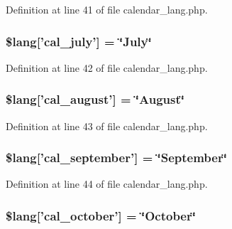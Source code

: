 Definition at line 41 of file calendar\-\_\-lang.\-php.

\hypertarget{calendar__lang_8php_a067d03b1260e590cabb18e68c08f3868}{
\subsubsection[{\$lang}]{\setlength{\rightskip}{0pt plus 5cm}\$lang\mbox{[}'cal\-\_\-july'\mbox{]} = \char`\"{}July\char`\"{}}}\label{calendar__lang_8php_a067d03b1260e590cabb18e68c08f3868}


Definition at line 42 of file calendar\-\_\-lang.\-php.

\hypertarget{calendar__lang_8php_a8e8cfd4eda2dda803f5c4f6cbbf2279f}{
\subsubsection[{\$lang}]{\setlength{\rightskip}{0pt plus 5cm}\$lang\mbox{[}'cal\-\_\-august'\mbox{]} = \char`\"{}August\char`\"{}}}\label{calendar__lang_8php_a8e8cfd4eda2dda803f5c4f6cbbf2279f}


Definition at line 43 of file calendar\-\_\-lang.\-php.

\hypertarget{calendar__lang_8php_a7223c2b685dfa0a6e9a9ebec0e9e912b}{
\subsubsection[{\$lang}]{\setlength{\rightskip}{0pt plus 5cm}\$lang\mbox{[}'cal\-\_\-september'\mbox{]} = \char`\"{}September\char`\"{}}}\label{calendar__lang_8php_a7223c2b685dfa0a6e9a9ebec0e9e912b}


Definition at line 44 of file calendar\-\_\-lang.\-php.

\hypertarget{calendar__lang_8php_af49c3d53649acdf354e7cf9a210f7aa0}{
\subsubsection[{\$lang}]{\setlength{\rightskip}{0pt plus 5cm}\$lang\mbox{[}'cal\-\_\-october'\mbox{]} = \char`\"{}October\char`\"{}}}\label{calendar__lang_8php_af49c3d53649acdf354e7cf9a210f7aa0}


